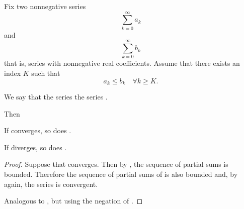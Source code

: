 \begin{proposition}\label{thm:positive_series_comparison}\mcite\cite[]{Фихтенгольц1968/2}
  Fix two nonnegative series
  \begin{equation}\label{def:positive_series_comparison/a}
    \sum_{k=0}^\infty a_k
  \end{equation}
  and
  \begin{equation}\label{def:positive_series_comparison/b}
    \sum_{k=0}^\infty b_k
  \end{equation}
  that is, series with nonnegative real coefficients. Assume that there exists an index \( K \) such that
  \begin{equation*}
    a_k \leq b_k \quad\forall k \geq K.
  \end{equation*}

  We say that the series   the series .

  Then
  \begin{thmenum}
     If  converges, so does .

     If  diverges, so does .
  \end{thmenum}
\end{proposition}
\begin{proof}
   Suppose that  converges. Then by , the sequence of partial sums is bounded. Therefore the sequence of partial sums of  is also bounded and, by  again, the series is convergent.

   Analogous to , but using the negation of .
\end{proof}

